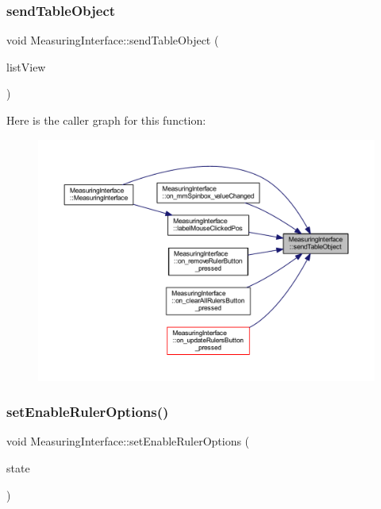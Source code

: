 \subsubsection{\texorpdfstring{sendTableObject}{sendTableObject}}
{\footnotesize\ttfamily void Measuring\+Interface\+::send\+Table\+Object (\begin{DoxyParamCaption}\item[{Q\+Table\+View \&}]{list\+View }\end{DoxyParamCaption})\hspace{0.3cm}{\ttfamily [signal]}}

Here is the caller graph for this function\+:
\nopagebreak
\begin{figure}[H]
\begin{center}
\leavevmode
\includegraphics[width=350pt]{classMeasuringInterface_a1c458529cab62e1c2aa540107aa5285a_icgraph}
\end{center}
\end{figure}
\mbox{\label{classMeasuringInterface_acf541a942e47266c30a8d473de4aca98}} 
\subsubsection{\texorpdfstring{setEnableRulerOptions()}{setEnableRulerOptions()}}
{\footnotesize\ttfamily void Measuring\+Interface\+::set\+Enable\+Ruler\+Options (\begin{DoxyParamCaption}\item[{bool}]{state }\end{DoxyParamCaption})\hspace{0.3cm}{\ttfamily [private]}}



